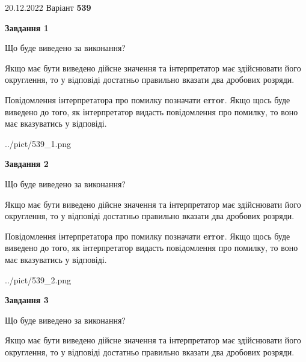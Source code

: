\documentclass[12pt, ukrainian]{article}
\begin{document}
{20.12.2022 Варіант \No \textbf { 539 }\par}
{
\begin {Large}

{\begin {center}\textbf{Завдання 1}\end {center}}\par
Що буде виведено за виконання? \par

Якщо має бути виведено дійсне значення та інтерпретатор має здійснювати його округлення, 
то у відповіді достатньо правильно вказати два дробових розряди.

Повідомлення інтерпретатора про помилку позначати \textbf{error}.
Якщо щось буде виведено до того, як інтерпретатор видасть повідомлення про помилку, 
то воно має вказуватись у відповіді. \par

\begin{center}
	{../pict/539_1.png}
\end{center}
\newpage

{\begin {center}\textbf{Завдання 2}\end {center}}\par
Що буде виведено за виконання? \par

Якщо має бути виведено дійсне значення та інтерпретатор має здійснювати його округлення, 
то у відповіді достатньо правильно вказати два дробових розряди.

Повідомлення інтерпретатора про помилку позначати \textbf{error}.
Якщо щось буде виведено до того, як інтерпретатор видасть повідомлення про помилку, 
то воно має вказуватись у відповіді. \par

\begin{center}
	{../pict/539_2.png}
\end{center}
\newpage

{\begin {center}\textbf{Завдання 3}\end {center}}\par
Що буде виведено за виконання? \par

Якщо має бути виведено дійсне значення та інтерпретатор має здійснювати його округлення, 
то у відповіді достатньо правильно вказати два дробових розряди.


\end{Large}}
\end{document}
